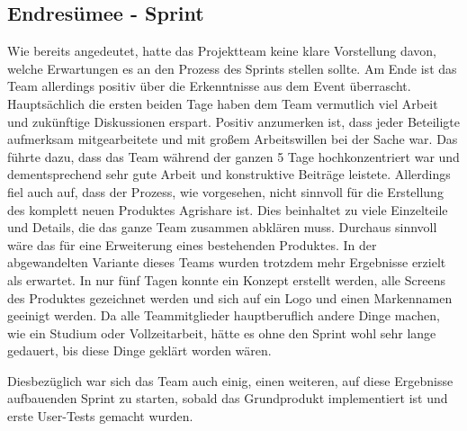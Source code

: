 \subsection*{Endresümee - Sprint}
Wie bereits angedeutet, hatte das Projektteam keine klare Vorstellung davon, welche Erwartungen es an den Prozess des Sprints stellen sollte. Am Ende ist das Team allerdings positiv über die Erkenntnisse aus dem Event überrascht. Hauptsächlich die ersten beiden Tage haben dem Team vermutlich viel Arbeit und zukünftige Diskussionen erspart. Positiv anzumerken ist, dass jeder Beteiligte aufmerksam mitgearbeitete und mit großem Arbeitswillen bei der Sache war. Das führte dazu, dass das Team während der ganzen 5 Tage hochkonzentriert war und dementsprechend sehr gute Arbeit und konstruktive Beiträge leistete. Allerdings fiel auch auf, dass der Prozess, wie vorgesehen, nicht sinnvoll für die Erstellung des komplett neuen Produktes Agrishare ist. Dies beinhaltet zu viele Einzelteile und Details, die das ganze Team zusammen abklären muss. Durchaus sinnvoll wäre das für eine Erweiterung eines bestehenden Produktes. In der abgewandelten Variante dieses Teams wurden trotzdem mehr Ergebnisse erzielt als erwartet. In nur fünf Tagen konnte ein Konzept erstellt werden, alle Screens des Produktes gezeichnet werden und sich auf ein Logo und einen Markennamen geeinigt werden. Da alle Teammitglieder hauptberuflich andere Dinge machen, wie ein Studium oder Vollzeitarbeit, hätte es ohne den Sprint wohl sehr lange gedauert, bis diese Dinge geklärt worden wären.

Diesbezüglich war sich das Team auch einig, einen weiteren, auf diese Ergebnisse aufbauenden Sprint zu starten, sobald das Grundprodukt implementiert ist und erste User-Tests gemacht wurden.
